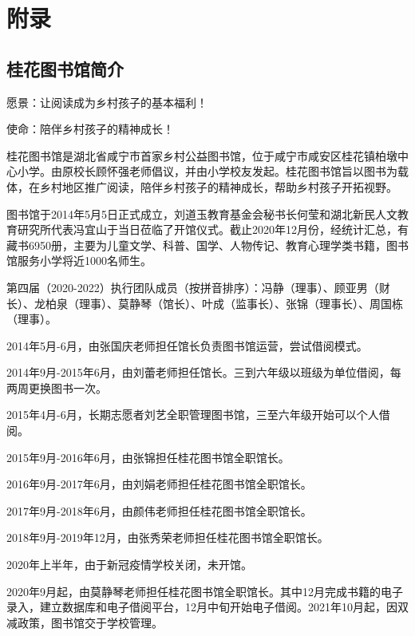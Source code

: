 \section{附录}
\vspace{10pt}

{\centering\subsection*{桂花图书馆简介}}


\renewcommand{\leftmark}{桂花图书馆简介}


   愿景：让阅读成为乡村孩子的基本福利！
   
   使命：陪伴乡村孩子的精神成长！
   
    桂花图书馆是湖北省咸宁市首家乡村公益图书馆，位于咸宁市咸安区桂花镇柏墩中心小学。由原校长顾怀强老师倡议，并由小学校友发起。桂花图书馆旨以图书为载体，在乡村地区推广阅读，陪伴乡村孩子的精神成长，帮助乡村孩子开拓视野。
    
    图书馆于2014年5月5日正式成立，刘道玉教育基金会秘书长何莹和湖北新民人文教育研究所代表冯宜山于当日莅临了开馆仪式。截止2020年12月份，经统计汇总，有藏书6950册，主要为儿童文学、科普、国学、人物传记、教育心理学类书籍，图书馆服务小学将近1000名师生。
    
    第四届（2020-2022）执行团队成员（按拼音排序）：冯静（理事）、顾亚男（财长）、龙柏泉（理事）、莫静琴（馆长）、叶成（监事长）、张锦（理事长）、周国栋（理事）。
    

    2014年5月-6月，由张国庆老师担任馆长负责图书馆运营，尝试借阅模式。
    
    2014年9月-2015年6月，由刘蕾老师担任馆长。三到六年级以班级为单位借阅，每两周更换图书一次。
    
    2015年4月-6月，长期志愿者刘艺全职管理图书馆，三至六年级开始可以个人借阅。
    
    2015年9月-2016年6月，由张锦担任桂花图书馆全职馆长。
    
    2016年9月-2017年6月，由刘娟老师担任桂花图书馆全职馆长。
    
    2017年9月-2018年6月，由颜伟老师担任桂花图书馆全职馆长。
    
    2018年9月-2019年12月，由张秀荣老师担任桂花图书馆全职馆长。
    
    2020年上半年，由于新冠疫情学校关闭，未开馆。
    
    2020年9月起，由莫静琴老师担任桂花图书馆全职馆长。其中12月完成书籍的电子录入，建立数据库和电子借阅平台，12月中旬开始电子借阅。2021年10月起，因双减政策，图书馆交于学校管理。
    
